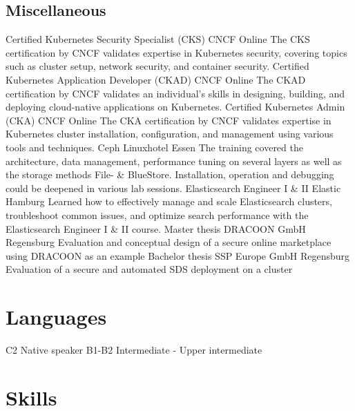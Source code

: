 \documentclass[11pt,a4paper,sans,final]{moderncv}
\begin{document}
		\subsection{Miscellaneous}
						{Certified Kubernetes Security Specialist (CKS)}	{CNCF}							{Online}		{}	{The CKS certification by CNCF validates expertise in Kubernetes security, covering topics such as cluster setup, network security, and container security.}
						{Certified Kubernetes Application Developer (CKAD)}	{CNCF}							{Online}		{}	{The CKAD certification by CNCF validates an individual's skills in designing, building, and deploying cloud-native applications on Kubernetes.}
						{Certified Kubernetes Admin (CKA)}					{CNCF}							{Online}		{}	{The CKA certification by CNCF validates expertise in Kubernetes cluster installation, configuration, and management using various tools and techniques.}
						{Ceph}												{Linuxhotel}					{Essen}			{}	{The training covered the architecture, data management, performance tuning on several layers as well as the storage methods File- \& BlueStore. Installation, operation and debugging could be deepened in various lab sessions.}
						{Elasticsearch Engineer I \& II}					{Elastic}						{Hamburg}		{}	{Learned how to effectively manage and scale Elasticsearch clusters, troubleshoot common issues, and optimize search performance with the Elasticsearch Engineer I \& II course.}
						{Master thesis}										{DRACOON GmbH}					{Regensburg}	{}	{Evaluation and conceptual design of a secure online marketplace using DRACOON as an example}
						{Bachelor thesis}									{SSP Europe GmbH}				{Regensburg}	{}	{Evaluation of a secure and automated SDS deployment on a cluster}
	
	\section{Languages}
			{C2}	{Native speaker}
			{B1-B2}	{Intermediate - Upper intermediate}
	
	\section{Skills}
	
	\cvskilllegend*[1em]{} %
	\cvskillhead[-0.1em] %
	\setcvskilllegendcolumns[][0.1]
	
\end{document}
